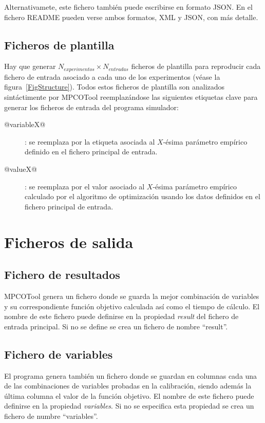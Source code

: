 \documentclass[a4paper]{report}
\begin{document}
Alternativamete, este fichero también puede escribirse en formato JSON. En el
fichero README pueden verse ambos formatos, XML y JSON, con más detalle.

\subsection{Ficheros de plantilla}

Hay que generar $N_{experimentos}\times N_{entradas}$ ficheros de plantilla para
reproducir cada fichero de entrada asociado a cada uno de los experimentos
(véase la figura~\ref{FigStructure}). Todos estos ficheros de plantilla son
analizados sintáctimente por MPCOTool reemplazándose las siguientes etiquetas
clave para generar los ficheros de entrada del programa simulador:
\begin{description}
\item[@variableX@]: se reemplaza por la etiqueta asociada al $X$-ésima parámetro
	empírico definido en el fichero principal de entrada.
\item[@valueX@]: se reemplaza por el valor asociado al $X$-ésima parámetro
	empírico calculado por el algoritmo de optimización usando los datos
	definidos en el fichero principal de entrada.
\end{description}

\section{Ficheros de salida}

\subsection{Fichero de resultados}

MPCOTool genera un fichero donde se guarda la mejor combinación de variables y
su correspondiente función objetivo calculada así como el tiempo de cálculo. El
nombre de este fichero puede definirse en la propiedad \emph{result} del fichero
de entrada principal. Si no se define se crea un fichero de nombre ``result''.

\subsection{Fichero de variables}

El programa genera también un fichero donde se guardan en columnas cada una de
las combinaciones de variables probadas en la calibración, siendo además la
última columna el valor de la función objetivo. El nombre de este fichero puede
definirse en la propiedad \emph{variables}. Si no se especifica esta propiedad
se crea un fichero de numbre ``variables''.
\end{document}
